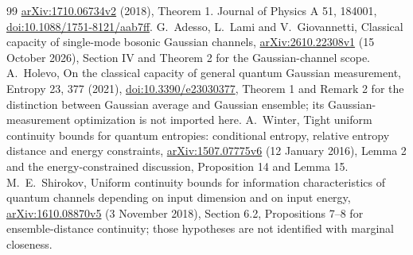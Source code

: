 \documentclass[11pt]{article}
\begin{document}
\begin{thebibliography}{99}
\href{https://arxiv.org/abs/1710.06734v2}{arXiv:1710.06734v2} (2018),
Theorem 1. Journal of Physics A 51, 184001,
\href{https://doi.org/10.1088/1751-8121/aab7ff}{doi:10.1088/1751-8121/aab7ff}.
 G.~Adesso, L.~Lami and V.~Giovannetti,
Classical capacity of single-mode bosonic Gaussian channels,
\href{https://arxiv.org/abs/2610.22308v1}{arXiv:2610.22308v1}
(15 October 2026), Section IV and Theorem 2 for the Gaussian-channel scope.
 A.~Holevo, On the classical capacity of
general quantum Gaussian measurement, Entropy 23, 377 (2021),
\href{https://doi.org/10.3390/e23030377}{doi:10.3390/e23030377},
Theorem 1 and Remark 2 for the distinction between Gaussian average
and Gaussian ensemble; its Gaussian-measurement optimization is not
imported here.
 A.~Winter, Tight uniform continuity bounds for quantum
entropies: conditional entropy, relative entropy distance and energy
constraints, \href{https://arxiv.org/abs/1507.07775v6}{arXiv:1507.07775v6}
(12 January 2016), Lemma 2 and the energy-constrained discussion,
Proposition 14 and Lemma 15.
 M.~E.~Shirokov, Uniform continuity bounds for
information characteristics of quantum channels depending on input
dimension and on input energy,
\href{https://arxiv.org/abs/1610.08870v5}{arXiv:1610.08870v5}
(3 November 2018), Section 6.2, Propositions 7--8 for ensemble-distance
continuity; those hypotheses are not identified with marginal closeness.
\end{thebibliography}
\end{document}
